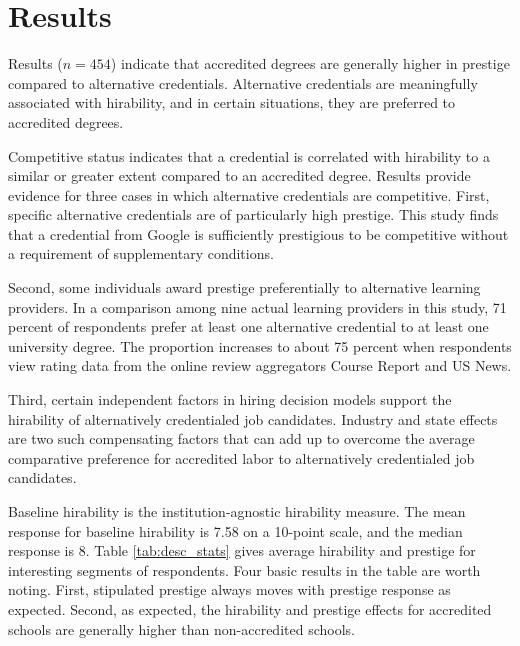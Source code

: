 \section{Results}

Results ($n = 454$) indicate that accredited degrees are generally higher in prestige compared to alternative credentials.
Alternative credentials are meaningfully associated with hirability,
and in certain situations, they are preferred to accredited degrees.

Competitive status indicates that a credential is correlated with hirability to a similar or greater extent compared to an accredited degree.
Results provide evidence for three cases in which alternative credentials are competitive.
First, specific alternative credentials are of particularly high prestige.
This study finds that a credential from Google is sufficiently prestigious to be competitive without a requirement of supplementary conditions.

Second, some individuals award prestige preferentially to alternative learning providers.
In a comparison among nine actual learning providers in this study,
71 percent of respondents prefer at least one alternative credential to at least one university degree.
The proportion increases to about 75 percent when respondents view rating data from the online review aggregators Course Report and US News.

Third, certain independent factors in hiring decision models support the hirability of alternatively credentialed job candidates.
Industry and state effects are two such compensating factors that can add up to overcome the average comparative preference for accredited labor to alternatively credentialed job candidates.

Baseline hirability is the institution-agnostic hirability measure.
The mean response for baseline hirability is 7.58 on a 10-point scale, and the median response is 8.
Table \ref{tab:desc_stats} gives average hirability and prestige for interesting segments of respondents.
Four basic results in the table are worth noting.
First, stipulated prestige always moves with prestige response as expected.
Second, as expected, the hirability and prestige effects for accredited schools are generally higher than non-accredited schools.

